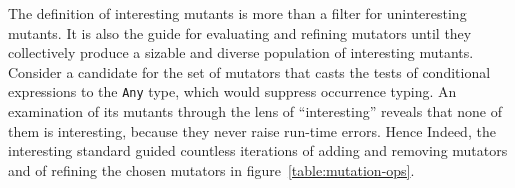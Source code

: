 The definition of interesting mutants is more than a filter for uninteresting
mutants. It is also the guide for evaluating and refining mutators until they
collectively produce a sizable and diverse population of interesting
mutants. Consider a candidate for the set of mutators that casts the tests of conditional
expressions to the {\tt Any} type, which would suppress occurrence typing. An
examination of its mutants through the lens of ``interesting'' reveals that none
of them is interesting, because they never raise run-time errors. Hence Indeed,
the interesting standard guided countless iterations of adding and removing
mutators and of refining the chosen mutators in figure~\ref{table:mutation-ops}.

